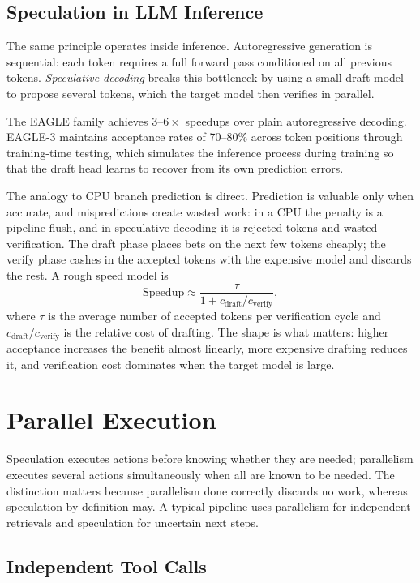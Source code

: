 \documentclass[11pt]{book}
\begin{document}
\subsection{Speculation in LLM Inference}

The same principle operates inside inference. Autoregressive generation is sequential: each token requires a full forward pass conditioned on all previous tokens. \emph{Speculative decoding} \cite{leviathan2023fast, chen2023accelerating} breaks this bottleneck by using a small draft model to propose several tokens, which the target model then verifies in parallel.

The EAGLE family \cite{li2024eagle, li2024eagle2, li2025eagle3} achieves $3$--$6\times$ speedups over plain autoregressive decoding. EAGLE-3 maintains acceptance rates of 70--80\% across token positions through training-time testing, which simulates the inference process during training so that the draft head learns to recover from its own prediction errors.

The analogy to CPU branch prediction is direct. Prediction is valuable only when accurate, and mispredictions create wasted work: in a CPU the penalty is a pipeline flush, and in speculative decoding it is rejected tokens and wasted verification. The draft phase places bets on the next few tokens cheaply; the verify phase cashes in the accepted tokens with the expensive model and discards the rest. A rough speed model is
\[
\text{Speedup} \approx \frac{\tau}{1 + c_{\text{draft}}/c_{\text{verify}}},
\]
where $\tau$ is the average number of accepted tokens per verification cycle and $c_{\text{draft}}/c_{\text{verify}}$ is the relative cost of drafting. The shape is what matters: higher acceptance increases the benefit almost linearly, more expensive drafting reduces it, and verification cost dominates when the target model is large.

\section{Parallel Execution}

Speculation executes actions before knowing whether they are needed; parallelism executes several actions simultaneously when all are known to be needed. The distinction matters because parallelism done correctly discards no work, whereas speculation by definition may. A typical pipeline uses parallelism for independent retrievals and speculation for uncertain next steps.

\subsection{Independent Tool Calls}
\end{document}
